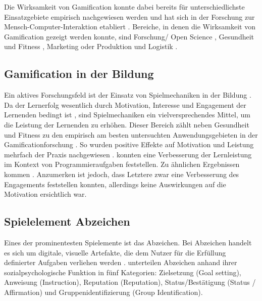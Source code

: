 Die Wirksamkeit von Gamification konnte dabei bereits für unterschiedlichste Einsatzgebiete empirisch nachgewiesen werden \cite{koivisto_rise_2019} und hat sich in der Forschung zur Mensch-Computer-Interaktion etabliert \cite{huotari_defining_2012}. 
Bereiche, in denen die Wirksamkeit von Gamification gezeigt werden konnte, sind Forschung/ Open Science \cite{brauer_erhohung_2019,kidwell_badges_2016}, Gesundheit und Fitness \cite{johnson_gamification_2016}, Marketing \cite{huotari_defining_2012} oder Produktion und Logistik \cite{warmelink_gamification_2018}.


\subsection{Gamification in der Bildung}
Ein aktives Forschungsfeld ist der Einsatz von Spielmechaniken in der Bildung \cite{ibanez_gamification_2014,landers_enhancing_2017}. Da der Lernerfolg wesentlich durch Motivation, Interesse und Engagement der Lernenden bedingt ist \cite{astin_student_1984}, sind Spielmechaniken ein vielversprechendes Mittel, um die Leistung der Lernenden zu erhöhen.
Dieser Bereich zählt neben Gesundheit und Fitness zu den empirisch am besten untersuchten Anwendungsgebieten in der Gamificationforschung \cite{koivisto_rise_2019}.
So wurden positive Effekte auf Motivation und Leistung mehrfach der Praxis nachgewiesen \cite{ibanez_gamification_2014,hamzah_influence_2015,strmecki_gamification_2015}. \citeauthor{layth_khaleel_empirical_2019} konnten eine Verbesserung der Lernleistung im Kontext von Programmieraufgaben feststellen. Zu ähnlichen Ergebnissen kommen \cite{ortiz_gamification_2017}. Anzumerken ist jedoch, dass Letztere zwar eine Verbesserung des Engagements feststellen konnten, allerdings keine Auswirkungen auf die Motivation ersichtlich war.




\subsection{Spielelement Abzeichen}
Eines der prominentesten Spielemente ist das Abzeichen. Bei Abzeichen handelt es sich um digitale, visuelle Artefakte, die dem Nutzer für die Erfüllung definierter Aufgaben verliehen werden \cite{antin_badges_2011}. \citeauthor{antin_badges_2011} unterteilen Abzeichen anhand ihrer sozialpsychologische Funktion in fünf Kategorien: Zielsetzung (Goal setting), Anweisung (Instruction), Reputation (Reputation),
Status/Bestätigung (Status / Affirmation) und Gruppenidentifizierung (Group Identification). 

